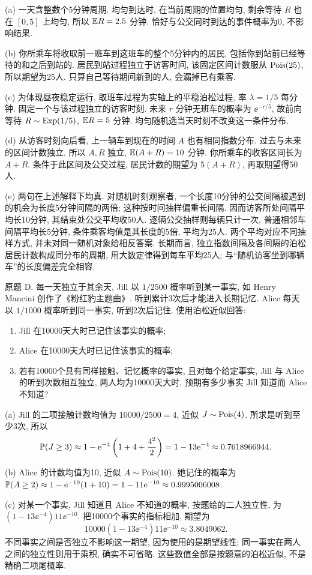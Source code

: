 \begin{solution}
(a) 一天含整数个5分钟周期. 均匀到达时, 在当前周期的位置均匀, 剩余等待 $R$ 也在 $[0,5]$ 上均匀, 所以 $\mathbb E R=2.5$ 分钟. 恰好与公交同时到达的事件概率为0, 不影响结果.

(b) 你所乘车将收取前一班车到这班车的整个5分钟内的居民, 包括你到站前已经等待的和之后到站的. 居民到站过程独立于访客时间, 该固定区间计数服从 $\operatorname{Pois}(25)$, 所以期望为25人. 只算自己等待期间新到的人, 会漏掉已有乘客.

(c) 为体现昼夜稳定运行, 取班车过程为实轴上的平稳泊松过程, 率 $\lambda=1/5$ 每分钟. 固定一个与该过程独立的访客时刻. 未来 $r$ 分钟无班车的概率为 $\ee^{-r/5}$, 故前向等待 $R\sim\operatorname{Exp}(1/5)$, $\mathbb E R=5$ 分钟. 均匀随机选当天时刻不改变这一条件分布.

(d) 从访客时刻向后看, 上一辆车到现在的时间 $A$ 也有相同指数分布. 过去与未来的区间计数独立, 所以 $A,R$ 独立, $\mathbb E(A+R)=10$ 分钟. 你所乘车的收客区间长为 $A+R$. 条件于此区间及公交过程, 居民计数的期望为 $5(A+R)$, 再取期望得50人.

(e) 两句在上述解释下均真. 对随机时刻观察者, 一个长度10分钟的公交间隔被遇到的机会为长度5分钟间隔的两倍; 这种按时间抽样偏重长间隔. 因而访客所处间隔平均长10分钟, 其结束处公交平均收50人. 逐辆公交抽样则每辆只计一次, 普通相邻车间隔平均长5分钟, 条件乘客均值是其长度的5倍, 平均为25人. 两个平均对应不同抽样方式, 并未对同一随机对象给相反答案. 长期而言, 独立指数间隔及各间隔的泊松居民计数构成同分布的周期, 用大数定律得到每车平均25人; 与“随机访客坐到哪辆车”的长度偏差完全相容.
\end{solution}

\begin{exercise}\label{ps5-d}
原题 D. 每一天独立于其余天, Jill 以 $1/2500$ 概率听到某一事实, 如 Henry Mancini 创作了《粉红豹主题曲》. 听到累计3次后才能进入长期记忆. Alice 每天以 $1/1000$ 概率听到同一事实, 听到2次后记住. 使用泊松近似回答:
\begin{enumerate}[label=(\alph*)]
\item Jill 在10000天大时已记住该事实的概率;
\item Alice 在10000天大时已记住该事实的概率;
\item 若有10000个具有同样接触、记忆概率的事实, 且对每个给定事实, Jill 与 Alice 的听到次数相互独立, 两人均为10000天大时, 预期有多少事实 Jill 知道而 Alice 不知道?
\end{enumerate}
\end{exercise}
\begin{solution}
(a) Jill 的二项接触计数均值为 $10000/2500=4$, 近似 $J\sim\operatorname{Pois}(4)$. 所求是听到至少3次, 所以
\[
\mathbb P(J\ge3)\approx1-\mathrm e^{-4}\left(1+4+\frac{4^2}{2}\right)
=1-13\mathrm e^{-4}\approx0.7618966944.
\]

(b) Alice 的计数均值为10, 近似 $A\sim\operatorname{Pois}(10)$. 她记住的概率为
$\mathbb P(A\ge2)\approx1-\mathrm e^{-10}(1+10)=1-11\mathrm e^{-10}\approx0.9995006008$.

(c) 对某一个事实, Jill 知道且 Alice 不知道的概率, 按题给的二人独立性, 为
$(1-13\ee^{-4})11\ee^{-10}$.
把10000个事实的指标相加, 期望为
\[
10000(1-13\ee^{-4})11\ee^{-10}\approx3.8049062.
\]
不同事实之间是否独立不影响这一期望, 因为使用的是期望线性; 同一事实在两人之间的独立性则用于乘积, 确实不可省略. 这些数值全部是按题意的泊松近似, 不是精确二项尾概率.
\end{solution}

